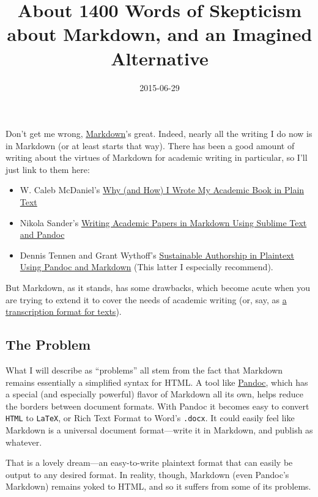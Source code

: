 \documentclass[
  12pt,
]{article}
\title{About 1400 Words of Skepticism about Markdown, and an Imagined
Alternative}
\author{}
\date{2015-06-29}
\providecommand{\tightlist}{%
  \setlength{\itemsep}{0pt}\setlength{\parskip}{0pt}}
\begin{document}
Don't get me wrong,
\href{http://daringfireball.net/projects/markdown/}{Markdown}'s great.
Indeed, nearly all the writing I do now is in Markdown (or at least
starts that way). There has been a good amount of writing about the
virtues of Markdown for academic writing in particular, so I'll just
link to them here:

\begin{itemize}
\tightlist
\item
  W. Caleb McDaniel's
  \href{http://wcm1.web.rice.edu/my-academic-book-in-plain-text.html}{Why
  (and How) I Wrote My Academic Book in Plain Text}
\item
  Nikola Sander's
  \href{http://nikolasander.com/writing-in-markdown/}{Writing Academic
  Papers in Markdown Using Sublime Text and Pandoc}
\item
  Dennis Tennen and Grant Wythoff's
  \href{http://programminghistorian.org/lessons/sustainable-authorship-in-plain-text-using-pandoc-and-markdown}{Sustainable
  Authorship in Plaintext Using Pandoc and Markdown} (This latter I
  especially recommend).
\end{itemize}

But Markdown, as it stands, has some drawbacks, which become acute when
you are trying to extend it to cover the needs of academic writing (or,
say, as \href{http://web.uvic.ca/~mvp1922/otsummit/}{a transcription
format for texts}).

\hypertarget{the-problem}{%
\subsection{The Problem}\label{the-problem}}

What I will describe as ``problems'' all stem from the fact that
Markdown remains essentially a simplified syntax for HTML. A tool like
\href{http://pandoc.org}{Pandoc}, which has a special (and especially
powerful) flavor of Markdown all its own, helps reduce the borders
between document formats. With Pandoc it becomes easy to convert
\texttt{HTML} to \texttt{LaTeX}, or Rich Text Format to Word's
\texttt{.docx}. It could easily feel like Markdown is a universal
document format---write it in Markdown, and publish as whatever.

That is a lovely dream---an easy-to-write plaintext format that can
easily be output to any desired format. In reality, though, Markdown
(even Pandoc's Markdown) remains yoked to HTML, and so it suffers from
some of its problems.
\end{document}
